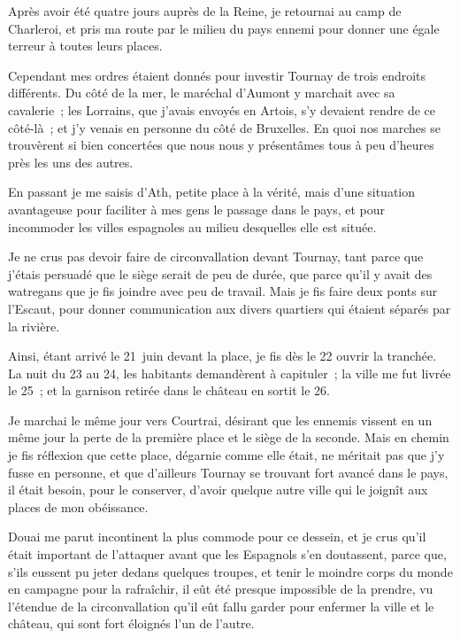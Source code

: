 \documentclass[french,twoside]{book} %
\begin{document}
Après avoir été quatre jours auprès de la Reine, je retournai au camp de Charleroi, et pris ma route par le milieu du pays ennemi pour donner une égale terreur à toutes leurs places.\par
Cependant mes ordres étaient donnés pour investir Tournay de trois endroits différents. Du côté de la mer, le maréchal d’Aumont y marchait avec sa cavalerie ; les Lorrains, que j’avais envoyés en Artois, s’y devaient rendre de ce côté-là ; et j’y venais en personne du côté de Bruxelles. En quoi nos marches se trouvèrent si bien concertées que nous nous y présentâmes tous à peu d’heures près les uns des autres.\par
En passant je me saisis d’Ath, petite place à la vérité, mais d’une situation avantageuse pour faciliter à mes gens le passage dans le pays, et pour incommoder les villes espagnoles au milieu desquelles elle est située.\par
Je ne crus pas devoir faire de circonvallation devant Tournay, tant parce que j’étais persuadé que le siège serait de peu de durée, que parce qu’il y avait des watregans que je fis joindre avec peu de travail. Mais je fis faire deux ponts sur l’Escaut, pour donner communication aux divers quartiers qui étaient séparés par la rivière.\par
Ainsi, étant arrivé le 21 juin devant la place, je fis dès le 22 ouvrir la tranchée. La nuit du 23 au 24, les habitants demandèrent à capituler ; la ville me fut livrée le 25 ; et la garnison retirée dans le château en sortit le 26.\par
Je marchai le même jour vers Courtrai, désirant que les ennemis vissent en un même jour la perte de la première place et le siège de la seconde. Mais en chemin je fis réflexion que cette place, dégarnie comme elle était, ne méritait pas que j’y fusse en personne, et que d’ailleurs Tournay se trouvant fort avancé dans le pays, il était besoin, pour le conserver, d’avoir quelque autre ville qui le joignît aux places de mon obéissance.\par
Douai me parut incontinent la plus commode pour ce dessein, et je crus qu’il était important de l’attaquer avant que les Espagnols s’en doutassent, parce que, s’ils eussent pu jeter dedans quelques troupes, et tenir le moindre corps du monde en campagne pour la rafraîchir, il eût été presque impossible de la prendre, vu l’étendue de la circonvallation qu’il eût fallu garder pour enfermer la ville et le château, qui sont fort éloignés l’un de l’autre.\par
\end{document}
